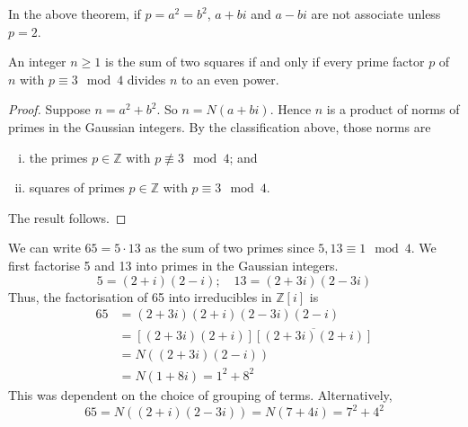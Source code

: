 \begin{remark}
	In the above theorem, if \( p = a^2 = b^2 \), \( a+bi \) and \( a-bi \) are not associate unless \( p = 2 \).
\end{remark}
\begin{corollary}
	An integer \( n \geq 1 \) is the sum of two squares if and only if every prime factor \( p \) of \( n \) with \( p \equiv 3 \mod 4 \) divides \( n \) to an even power.
\end{corollary}
\begin{proof}
	Suppose \( n = a^2 + b^2 \).
	So \( n = N(a+bi) \).
	Hence \( n \) is a product of norms of primes in the Gaussian integers.
	By the classification above, those norms are
	\begin{enumerate}[(i)]
		\item the primes \( p \in \mathbb Z \) with \( p \not\equiv 3 \mod 4 \); and
		\item squares of primes \( p \in \mathbb Z \) with \( p \equiv 3 \mod 4 \).
	\end{enumerate}
	The result follows.
\end{proof}
\begin{example}
	We can write \( 65 = 5 \cdot 13 \) as the sum of two primes since \( 5, 13 \equiv 1 \mod 4 \).
	We first factorise 5 and 13 into primes in the Gaussian integers.
	\[ 5 = (2+i)(2-i);\quad 13 = (2+3i)(2-3i) \]
	Thus, the factorisation of 65 into irreducibles in \( \mathbb Z[i] \) is
    \begin{align*}
        65 &= (2+3i)(2+i)(2-3i)(2-i) \\
        &= [(2+3i)(2+i)]\overline{[(2+3i)(2+i)]} \\
        &= N((2+3i)(2-i)) \\
        &= N(1+8i) = 1^2 + 8^2
    \end{align*}
	This was dependent on the choice of grouping of terms.
	Alternatively,
	\[ 65 = N((2+i)(2-3i)) = N(7+4i) = 7^2 + 4^2 \]
\end{example}


